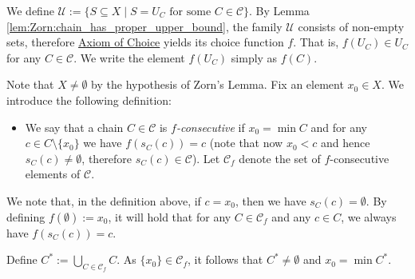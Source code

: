 \documentclass{article}
\begin{document}
We define $\mathcal{U} := \{ S \subseteq X \mid \mbox{$S = U_C$ for some $C \in \mathcal{C}$} \}$.
By Lemma \ref{lem:Zorn:chain_has_proper_upper_bound}, the family $\mathcal{U}$ consists of non-empty sets, therefore \underline{Axiom of Choice} yields its choice function $f$.
That is, $f(U_C) \in U_C$ for any $C \in \mathcal{C}$.
We write the element $f(U_C)$ simply as $f(C)$.

Note that $X \neq \emptyset$ by the hypothesis of Zorn's Lemma.
Fix an element $x_0 \in X$.
We introduce the following definition:
\begin{itemize}
    \item 
    We say that a chain $C \in \mathcal{C}$ is \emph{$f$-consecutive} if $x_0 = \min C$ and for any $c \in C \setminus \{x_0\}$ we have $f(s_C(c)) = c$ (note that now $x_0 < c$ and hence $s_C(c) \neq \emptyset$, therefore $s_C(c) \in \mathcal{C}$).
    Let $\mathcal{C}_f$ denote the set of $f$-consecutive elements of $\mathcal{C}$.
\end{itemize}
We note that, in the definition above, if $c = x_0$, then we have $s_C(c) = \emptyset$.
By defining $f(\emptyset) := x_0$, it will hold that for any $C \in \mathcal{C}_f$ and any $c \in C$, we always have $f(s_C(c)) = c$.

Define $C^* := \bigcup_{C \in \mathcal{C}_f} C$.
As $\{x_0\} \in \mathcal{C}_f$, it follows that $C^* \neq \emptyset$ and $x_0 = \min C^*$.
\end{document}
